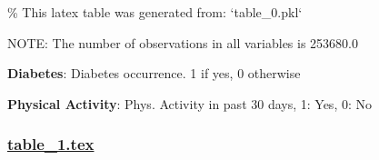 \documentclass[11pt]{article}
\begin{document}
\begin{codeoutput}
\% This latex table was generated from: `table\_0.pkl`
\begin{table}[h]
\caption{Descriptive statistics of key variables}
\label{table:desc\_stats}
\begin{threeparttable}
\renewcommand{\TPTminimum}{\linewidth}
\begin{tablenotes}
\footnotesize
\item NOTE: The number of observations in all variables is 253680.0
\item \textbf{Diabetes}: Diabetes occurrence. 1 if yes, 0 otherwise
\item \textbf{Physical Activity}: Phys. Activity in past 30 days, 1: Yes, 0: No
\end{tablenotes}
\end{threeparttable}
\end{table}

\end{codeoutput}

\subsubsection*{\hyperlink{code-LaTeX Table Design-table-1-tex}{table\_1.tex}}
\end{document}
